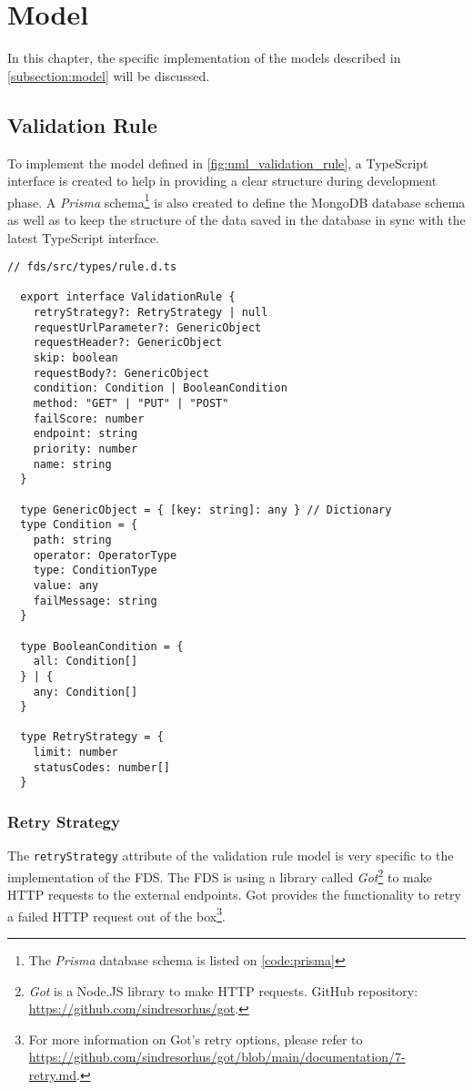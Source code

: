 \section{Model}

In this chapter, the specific implementation of the models described in \autoref{subsection:model} will be discussed. 

 \subsection{Validation Rule}
  To implement the model defined in \autoref{fig:uml_validation_rule}, a TypeScript interface is created to help in providing a clear structure during development phase. A \emph{Prisma} schema\footnote{The \emph{Prisma} database schema is listed on \autoref{code:prisma}} is also created to define the MongoDB database schema as well as to keep the structure of the data saved in the database in sync with the latest TypeScript interface. 

  \begin{lstlisting}[style=es6, caption={TypeScript interface of a validation rule (TypeScript)}]
  // fds/src/types/rule.d.ts
  
  export interface ValidationRule {
    retryStrategy?: RetryStrategy | null
    requestUrlParameter?: GenericObject
    requestHeader?: GenericObject
    skip: boolean
    requestBody?: GenericObject
    condition: Condition | BooleanCondition
    method: "GET" | "PUT" | "POST" 
    failScore: number
    endpoint: string
    priority: number
    name: string
  }
  
  type GenericObject = { [key: string]: any } // Dictionary
  type Condition = {
    path: string
    operator: OperatorType
    type: ConditionType
    value: any
    failMessage: string
  }

  type BooleanCondition = {
    all: Condition[]
  } | {
    any: Condition[]
  }

  type RetryStrategy = {
    limit: number
    statusCodes: number[] 
  }
  \end{lstlisting}
 
 \subsubsection{Retry Strategy}
  The \verb;retryStrategy; attribute of the validation rule model is very specific to the implementation of the FDS. The FDS is using a library called \emph{Got}\footnote{\emph{Got} is a Node.JS library to make HTTP requests. GitHub repository: \url{https://github.com/sindresorhus/got}.} to make HTTP requests to the external endpoints. Got provides the functionality to retry a failed HTTP request out of the box\footnote{For more information on Got's retry options, please refer to \url{https://github.com/sindresorhus/got/blob/main/documentation/7-retry.md}.}.

